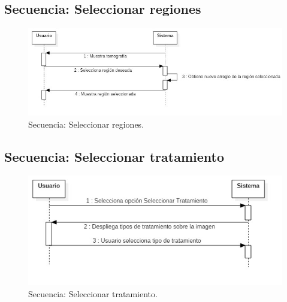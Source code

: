 \documentclass[12pt]{report}
\begin{document}
\subsection{Secuencia: Seleccionar regiones}
\begin{figure}[H]
\centering
\includegraphics[width = 12 cm, height = 7 cm]{region}
\caption{Secuencia: Seleccionar regiones.}
\end{figure}

\subsection{Secuencia: Seleccionar tratamiento}
\begin{figure}[H]
\centering
\includegraphics[width = 12 cm, height = 7 cm]{tratamientodeimagen}
\caption{Secuencia: Seleccionar tratamiento.}
\end{figure}
\end{document}
